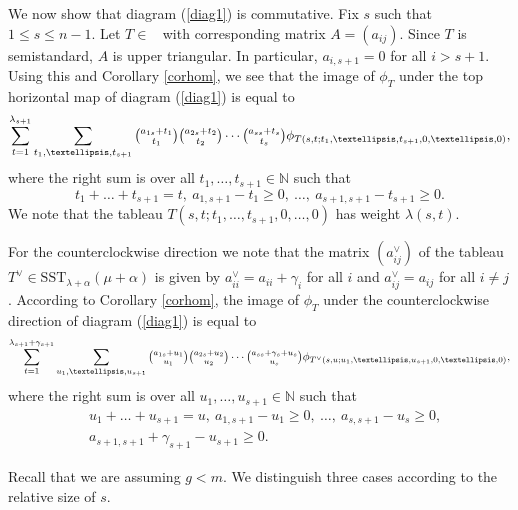 \documentclass[11pt]{article}
\theoremstyle{definition}
\numberwithin{equation}{section}
\newcommand{\al}{\alpha}
\newcommand{\la}{\lambda}
\DeclareMathOperator{\st}{SST_{\la}(\mu)}
\numberwithin{equation}{section}
\begin{document}
We now show that diagram (\ref{diag1}) is commutative. Fix $s$ such that $1 \le s \le n-1$. Let $ T \in \st$ with corresponding matrix $A=(a_{ij})$. Since $T$ is semistandard, $A$ is upper triangular. In particular, $a_{i, s+1}=0$ for all $i>s+1$. Using this and Corollary \ref{corhom}, we see that the image of $\phi_T$ under the top horizontal map of diagram (\ref{diag1}) is equal to \begin{equation}\label{eq111}
	\sum_{t=1}^{\lambda_{s+1}}\sum_{t_1,\dots,t_{s+1}}\tbinom{a_{1s}+t_1}{t_1}\tbinom{a_{2s}+t_2}{t_2} \cdots \tbinom{a_{ss}+t_s}{t_s}\phi_{T(s,t;t_1,\dots,t_{s+1},0,\dots,0)},\end{equation}
	where the right sum is over all  $t_1,\dots,t_{s+1} \in \mathbb{N} $ such that \begin{equation}\label{ineq1111}t_{1}+\dots+t_{s+1}=t,\  a_{1,s+1}-t_1 \ge 0, \ \dots, \ a_{s+1,s+1}-t_{s+1} \ge 0.\end{equation}
We note that the tableau $T(s,t;t_1,\dots,t_{s+1},0,\dots,0)$ has weight $\la(s,t)$.

For the counterclockwise direction we note that the matrix $(a^{\vee}_{ij})$ of the tableau $T^{\vee} \in \mathrm{SST}_{\la+\al}(\mu+\al)$ is given by $a^{\vee}_{ii} = a_{ii}+\gamma_i$ for all $i$ and $a^{\vee}_{ij} = a_{ij}$ for all $i \neq j$. According to Corollary \ref{corhom}, the image of $\phi_T$ under the counterclockwise direction of diagram (\ref{diag1}) is equal to \begin{equation}\label{eq211}
	\sum_{t=1}^{\lambda_{s+1}+\gamma_{s+1}}\sum_{u_1,\dots,u_{s+1}}\tbinom{a_{1s}+u_1}{u_1}\tbinom{a_{2s}+u_2}{u_2} \cdots \tbinom{a_{ss}+\gamma_s+u_s}{u_s}\phi_{T^{\vee}(s,u;u_1,\dots,u_{s+1},0,\dots,0)},\end{equation}
where the right sum is over all $u_1,\dots,u_{s+1} \in \mathbb{N}$ such that \begin{align*}&u_{1}+\dots+u_{s+1}=u, \  a_{1,s+1}-u_1 \ge 0, \  \dots, \  a_{s,s+1}-u_s \ge 0, \\ &a_{s+1,s+1}+\gamma_{s+1}-u_{s+1} \ge 0.\end{align*}

Recall that we are assuming $g<m$. We distinguish three cases according to the relative size of $s.$ 
\end{document}
